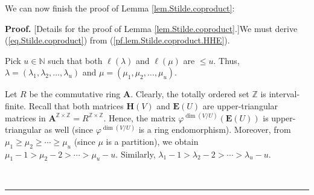\documentclass[numbers=enddot,12pt,final,onecolumn,notitlepage]{scrartcl}%
\numberwithin{exer}{section}
\theoremstyle{definition}
\newenvironment{proof}[1][Proof]{\noindent\textbf{#1.} }{\ \rule{0.5em}{0.5em}}
\theoremstyle{plainsl}
\begin{document}
We can now finish the proof of Lemma \ref{lem.Stilde.coproduct}:

\begin{proof}
[Details for the proof of Lemma \ref{lem.Stilde.coproduct}.]We must derive
(\ref{eq.Stilde.coproduct}) from (\ref{pf.lem.Stilde.coproduct.HHE}).

Pick $u\in\mathbb{N}$ such that both $\ell\left(  \lambda\right)  $ and
$\ell\left(  \mu\right)  $ are $\leq u$. Thus, $\lambda=\left(  \lambda
_{1},\lambda_{2},\ldots,\lambda_{u}\right)  $ and $\mu=\left(  \mu_{1},\mu
_{2},\ldots,\mu_{u}\right)  $.

Let $R$ be the commutative ring $\mathbf{A}$. Clearly, the totally ordered set
$\mathbb{Z}$ is interval-finite. Recall that both matrices $\mathbf{H}\left(
V\right)  $ and $\mathbf{E}\left(  U\right)  $ are upper-triangular matrices
in $\mathbf{A}^{\mathbb{Z}\times\mathbb{Z}}=R^{\mathbb{Z}\times\mathbb{Z}}$.
Hence, the matrix $\varphi^{\dim\left(  V/U\right)  }\left(  \mathbf{E}\left(
U\right)  \right)  $ is upper-triangular as well (since $\varphi^{\dim\left(
V/U\right)  }$ is a ring endomorphism). Moreover, from $\mu_{1}\geq\mu_{2}%
\geq\cdots\geq\mu_{u}$ (since $\mu$ is a partition), we obtain $\mu_{1}%
-1>\mu_{2}-2>\cdots>\mu_{u}-u$. Similarly, $\lambda_{1}-1>\lambda_{2}%
-2>\cdots>\lambda_{u}-u$.


\end{proof}
\end{document}

